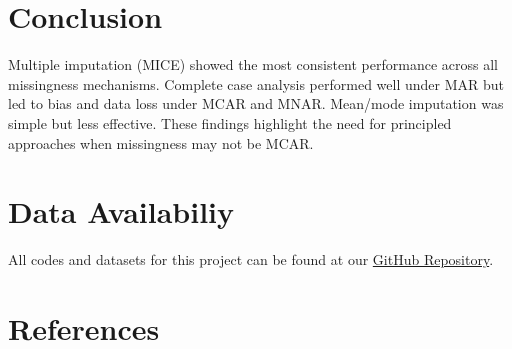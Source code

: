 \documentclass[
  letterpaper,
  DIV=11,
  numbers=noendperiod]{scrartcl}
\begin{document}
\section{Conclusion}\label{conclusion}

Multiple imputation (MICE) showed the most consistent performance across
all missingness mechanisms. Complete case analysis performed well under
MAR but led to bias and data loss under MCAR and MNAR. Mean/mode
imputation was simple but less effective. These findings highlight the
need for principled approaches when missingness may not be MCAR.

\newpage

\section{Data Availabiliy}\label{data-availabiliy}

All codes and datasets for this project can be found at our
\href{https://github.com/rophenceojiambo/Simulations-Final-Project}{GitHub
Repository}.

\section*{References}\label{references}
\end{document}
